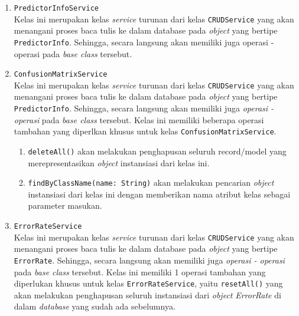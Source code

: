 \begin{enumerate}
\begin{enumerate}
	\end{enumerate}
	
	\item \texttt{PredictorInfoService}\\
	Kelas ini merupakan kelas \textit{service} turunan dari kelas \texttt{CRUDService} yang akan menangani proses baca tulis ke dalam database pada \textit{object} yang bertipe \texttt{PredictorInfo}. Sehingga, secara langsung akan memiliki juga operasi - operasi pada \textit{base class} tersebut. 
	
	\item \texttt{ConfusionMatrixService}\\
	Kelas ini merupakan kelas \textit{service} turunan dari kelas \texttt{CRUDService} yang akan menangani proses baca tulis ke dalam database pada \textit{object} yang bertipe \texttt{PredictorInfo}. Sehingga, secara langsung akan memiliki juga \textit{operasi - operasi} pada \textit{base class} tersebut. Kelas ini memiliki beberapa operasi tambahan yang diperlkan khusus untuk kelas \texttt{ConfusionMatrixService}.
	\begin{enumerate}
		\item \texttt{deleteAll()} akan melakukan penghapusan seluruh record/model yang merepresentasikan \textit{object} instansiasi dari kelas ini.
		\item \texttt{findByClassName(name: String)} akan melakukan pencarian \textit{object} instansiasi dari kelas ini dengan memberikan nama atribut kelas sebagai parameter masukan.
	\end{enumerate}
	
	\item \texttt{ErrorRateService}\\
	Kelas ini merupakan kelas \textit{service} turunan dari kelas \texttt{CRUDService} yang akan menangani proses baca tulis ke dalam database pada \textit{object} yang bertipe \texttt{ErrorRate}. Sehingga, secara langsung akan memiliki juga \textit{operasi - operasi} pada \textit{base class} tersebut. Kelas ini memiliki 1 operasi tambahan yang diperlukan khusus untuk kelas \texttt{ErrorRateService}, yaitu \texttt{resetAll()} yang akan melakukan penghapusan seluruh instansiasi dari \textit{object} \textit{ErrorRate} di dalam \textit{database} yang sudah ada sebelumnya.
	

\end{enumerate}
